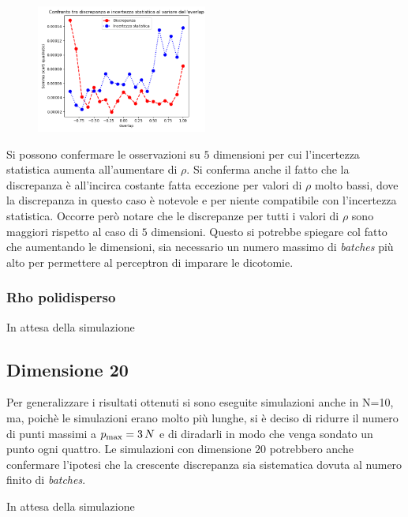 \documentclass[a4paper,12pt,twoside,openright]{report}
\begin{document}
\begin{figure}[!ht]
	\centering
	\includegraphics[width=0.5\textwidth]{immriassunto/statn10rhomono/error}
	\caption{}
	\label{fig:errorn10rhomono}
\end{figure}
Si possono confermare le osservazioni su $5$ dimensioni per cui l'incertezza statistica aumenta all'aumentare di $\rho$. Si conferma anche il fatto che la discrepanza è all'incirca costante fatta eccezione per valori di $\rho$ molto bassi, dove la discrepanza in questo caso è notevole e per niente compatibile con l'incertezza statistica. Occorre però notare che le discrepanze per tutti i valori di $\rho$ sono maggiori rispetto al caso di $5$ dimensioni. Questo si potrebbe spiegare col fatto che aumentando le dimensioni, sia necessario un numero massimo di \emph{batches} più alto per permettere al perceptron di imparare le dicotomie.


\subsubsection{Rho polidisperso}
\label{subsubsec:10dimrhopoli}
In attesa della simulazione


\subsection{Dimensione 20}
\label{subsec:20dim}
Per generalizzare i risultati ottenuti si sono eseguite simulazioni anche in N=10, ma, poichè le simulazioni erano molto più lunghe, si è deciso di ridurre il numero di punti massimi a $ p_\textup{max} = 3\,N $ e di diradarli in modo che venga sondato un punto ogni quattro. Le simulazioni con dimensione $20$ potrebbero anche confermare l'ipotesi che la crescente discrepanza sia sistematica dovuta al numero finito di \emph{batches}.

In attesa della simulazione
\end{document}
